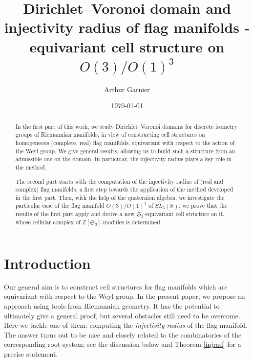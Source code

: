 \documentclass[11pt,twoside]{amsart}
\title[Dirichlet--Voronoi domain and injectivity radius of flag manifolds]{Dirichlet--Voronoi domain and injectivity radius of flag manifolds - equivariant cell structure on $O(3)/O(1)^3$}
\author{Arthur Garnier \orcidlink{0000-0003-4069-3203}}
\date{\today}
\theoremstyle{plain}
\newcommand{\R}{{\mathbb R}}
\newcommand{\Z}{{\mathbb Z}}
\newcommand{\Sym}{\mathfrak{S}}
\begin{document}
\begin{abstract}
In the first part of this work, we study Dirichlet--Voronoi domains for discrete isometry groups of Riemannian manifolds, in view of constructing cell structures on homogeneous (complete, real) flag manifolds, equivariant with respect to the action of the Weyl group. We give general results, allowing us to build such a structure from an admissible one on the domain. In particular, the injectivity radius plays a key role in the method.

The second part starts with the computation of the injectivity radius of (real and complex) flag manifolds; a first step towards the application of the method developed in the first part. Then, with the help of the quaternion algebra, we investigate the particular case of the flag manifold $O(3)/O(1)^3$ of $SL_3(\R)$: we prove that the results of the first part apply and derive a new $\Sym_3$-equivariant cell structure on it, whose cellular complex of $\Z[\Sym_3]$-modules is determined.
\end{abstract}

\maketitle








\section*{Introduction}


Our general aim is to construct cell structures for flag manifolds which are equivariant with respect to the Weyl group. In the present paper, we propose an approach using tools from Riemannian geometry. It has the potential to ultimately give a general proof, but several obstacles still need to be overcome. Here we tackle one of them: computing the \textit{injectivity radius} of the flag manifold. The answer turns out to be nice and closely related to the combinatorics of the corresponding root system; see the discussion below and Theorem \ref{injrad} for a precise statement.
\end{document}
